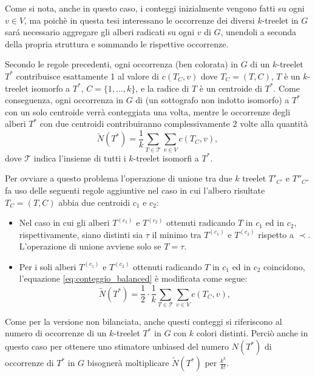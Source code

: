 Come si nota, anche in questo caso, i conteggi inizialmente vengono fatti su ogni $ v \in V $, ma poich\`e in questa tesi interessano le occorrenze dei diversi $ k $-treelet in $ G $  sar\'a necessario aggregare gli alberi radicati su ogni $ v $ di $ G $, unendoli a seconda della propria struttura e sommando le rispettive occorrenze.

Secondo le regole precedenti, ogni occorrenza (ben colorata) in $G$ di un $k$-treelet $T^*$ contribuisce esattamente 1 al valore di $c(T_C, v)$ dove $T_C = (T,C)$, $T$ è un $k$-treelet isomorfo a $T^*$, $C = \{1, \dots, k\}$, e la radice di $T$ è un centroide di $T^*$.
Come conseguenza, ogni occorrenza in $G$ di (un sottografo non indotto isomorfo) a $T^*$ con un solo centroide verrà conteggiata una volta, mentre le occorrenze degli alberi $T^*$ con due centroidi contribuiranno complessivamente $2$ volte alla quantità 
\begin{equation}
\label{eq:conteggio_balanced}
\widetilde{N}(T^*) = \frac{1}{k}\sum_{T \in \mathcal{T}} \sum_{v \in V} c( T_C, v),
\end{equation}
dove $\mathcal{T}$ indica l'insieme di tutti i $k$-treelet isomorfi a $T^*$.


Per ovviare a questo problema l'operazione di unione tra due $k$ treelet $T'_{C'}$ e $T''_{C''}$ fa uso delle seguenti regole aggiuntive nel caso in cui l'albero risultate $T_C = (T, C)$ abbia due centroidi $c_1$ e $c_2$:
\begin{itemize}
\item  Nel caso in cui gli alberi $T^{(c_1)}$ e $T^{(c_2)}$ ottenuti radicando $ T $
in $ c_1 $ ed in $ c_2 $, rispettivamente,  siano distinti sia $\tau$ il minimo tra $T^{(c_1)}$ e $T^{(c_2)}$ rispetto a $\prec$. L'operazione di unione avviene solo se $T = \tau$.

\item Per i soli alberi $T^{(c_1)}$ e $T^{(c_2)}$ ottenuti radicando $ T $
in $c_1$ ed in $c_2$ coincidono, l'equazione \eqref{eq:conteggio_balanced} è modificata come segue:
\[
\widetilde{N}(T^*) = \frac{1}{2} \cdot \frac{1}{k}\sum_{T \in \mathcal{T}} \sum_{v \in V} c( T_C, v),
\]
\end{itemize}


Come per la versione non bilanciata, anche questi conteggi si riferiscono al numero di occorrenze di un $ k $-treelet $ T^* $ in $ G $  con $ k $ colori distinti.
Perciò anche in questo caso per ottenere uno stimatore unbiased del numero $N(T^*)$ di occorrenze di $T^*$ in $G$ bisognerà moltiplicare $\widetilde{N}(T^*)$ per $ \frac{k^k}{k!} $.


